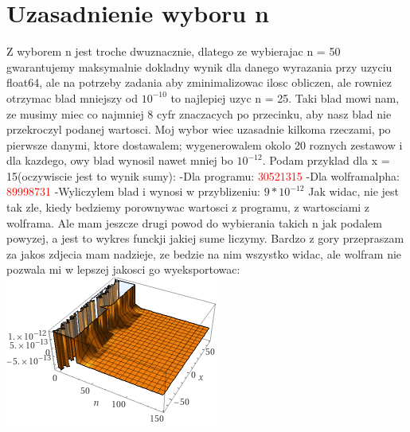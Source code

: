 \documentclass[a4paper,8pt]{article}
\begin{document}
\section{Uzasadnienie wyboru n}

Z wyborem n jest troche dwuznacznie, dlatego ze wybierajac n = 50 gwarantujemy maksymalnie dokladny wynik dla danego wyrazania przy uzyciu float64, ale na potrzeby zadania aby zminimalizowac ilosc obliczen, ale rowniez otrzymac blad mniejszy od $10^{-10}$ to najlepiej uzyc n = 25. Taki blad mowi nam, ze musimy miec co najmniej 8 cyfr znaczacych po przecinku, aby nasz blad nie przekroczyl podanej wartosci. 
\newline
Moj wybor wiec uzasadnie kilkoma rzeczami, po pierwsze danymi, ktore dostawalem; wygenerowalem okolo 20 roznych zestawow i dla kazdego, owy blad wynosil nawet mniej bo $10^{-12}$. Podam przyklad dla x = 15(oczywiscie jest to wynik sumy):
\quad -Dla programu:
\newline
{}\textcolor{red}{30521315}
\newline
\newline
\quad -Dla wolframalpha:
\newline
{}\textcolor{red}{89998731}
\newline
\newline
\quad -Wyliczylem blad i wynosi w przyblizeniu:
\newline
\newline
$9*10^{-12}$
\newline
Jak widac, nie jest tak zle, kiedy bedziemy porownywac wartosci z programu, z wartosciami z wolframa. Ale mam jeszcze drugi powod do wybierania takich n jak podalem powyzej, a jest to wykres funckji jakiej sume liczymy. Bardzo z gory przepraszam za jakos zdjecia mam nadzieje, ze bedzie na nim wszystko widac, ale wolfram nie pozwala mi w lepszej jakosci go wyeksportowac:
\newline
\includegraphics{wykres}
\end{document}
